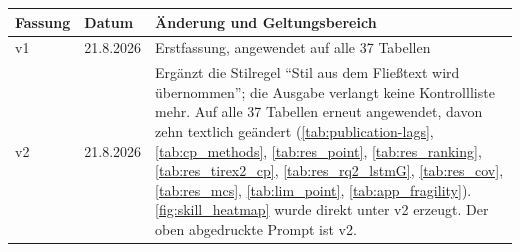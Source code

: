 \begin{tabular}{@{}llp{9cm}@{}}
\toprule
\textbf{Fassung} & \textbf{Datum} & \textbf{Änderung und Geltungsbereich} \\
\midrule
v1 & 21.8.2026 & Erstfassung, angewendet auf alle 37 Tabellen \\
\addlinespace
v2 & 21.8.2026 & Ergänzt die Stilregel ``Stil aus dem Fließtext wird
  übernommen''; die Ausgabe verlangt keine Kontrollliste mehr. Auf alle 37
  Tabellen erneut angewendet, davon zehn textlich geändert
  (\cref{tab:publication-lags}, \cref{tab:cp_methods}, \cref{tab:res_point},
  \cref{tab:res_ranking}, \cref{tab:res_tirex2_cp}, \cref{tab:res_rq2_lstmG},
  \cref{tab:res_cov}, \cref{tab:res_mcs}, \cref{tab:lim_point},
  \cref{tab:app_fragility}). \cref{fig:skill_heatmap} wurde direkt unter v2
  erzeugt. Der oben abgedruckte Prompt ist v2. \\
\bottomrule
\end{tabular}

